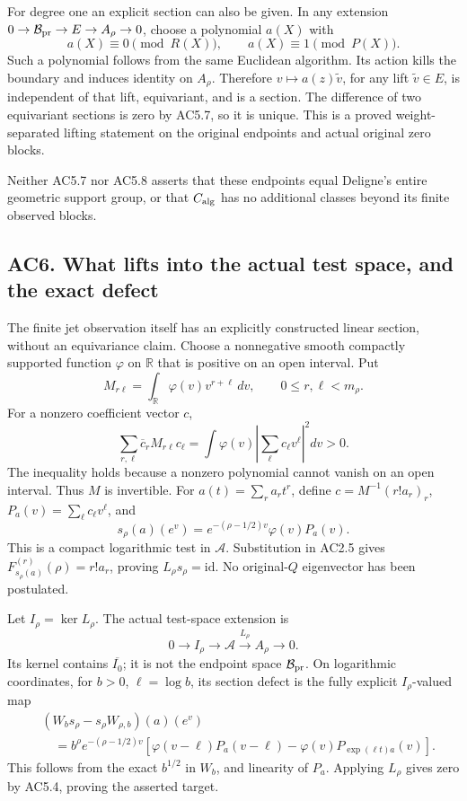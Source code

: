 For degree one an explicit section can also be given. In any extension
\(0\to\mathcal B_{\rm pr}\to E\to A_\rho\to0\), choose a polynomial
\(a(X)\) with \[
 a(X)\equiv0\pmod{R(X)},\qquad a(X)\equiv1\pmod{P(X)}.
\] Such a polynomial follows from the same Euclidean algorithm. Its
action kills the boundary and induces identity on \(A_\rho\). Therefore
\(v\mapsto a(z)\widetilde v\), for any lift \(\widetilde v\in E\), is
independent of that lift, equivariant, and is a section. The difference
of two equivariant sections is zero by AC5.7, so it is unique. This is a
proved weight-separated lifting statement on the original endpoints and
actual original zero blocks.

Neither AC5.7 nor AC5.8 asserts that these endpoints equal Deligne's
entire geometric support group, or that \(C_{\rm alg}\) has no
additional classes beyond its finite observed blocks.

\subsection{AC6. What lifts into the actual test space, and the exact
defect}\label{ac6.-what-lifts-into-the-actual-test-space-and-the-exact-defect}

The finite jet observation itself has an explicitly constructed linear
section, without an equivariance claim. Choose a nonnegative smooth
compactly supported function \(\varphi\) on \(\mathbb R\) that is
positive on an open interval. Put \[
 M_{r\ell}=\int_{\mathbb R}\varphi(v)v^{r+\ell}\,dv,
 \qquad 0\leq r,\ell<m_\rho.
\] For a nonzero coefficient vector \(c\), \[
 \sum_{r,\ell}\overline c_r M_{r\ell}c_\ell
 =\int\varphi(v)\left|\sum_\ell c_\ell v^\ell\right|^2dv>0.
\] The inequality holds because a nonzero polynomial cannot vanish on an
open interval. Thus \(M\) is invertible. For \(a(t)=\sum_ra_rt^r\),
define \(c=M^{-1}(r!a_r)_r\), \(P_a(v)=\sum_\ell c_\ell v^\ell\), and \[
 s_\rho(a)(e^v)=e^{-(\rho-1/2)v}\varphi(v)P_a(v).
\tag{AC6.1}
\] This is a compact logarithmic test in \(\mathcal A\). Substitution in
AC2.5 gives \(F_{s_\rho(a)}^{(r)}(\rho)=r!a_r\), proving
\(L_\rho s_\rho=\mathrm{id}\). No original-\(Q\) eigenvector has been
postulated.

Let \(I_\rho=\ker L_\rho\). The actual test-space extension is \[
 0\longrightarrow I_\rho\longrightarrow\mathcal A
 \xrightarrow{L_\rho}A_\rho\longrightarrow0.
\tag{AC6.2}
\] Its kernel contains \(\overline{I_0}\); it is not the endpoint space
\(\mathcal B_{\rm pr}\). On logarithmic coordinates, for \(b>0\),
\(\ell=\log b\), its section defect is the fully explicit
\(I_\rho\)-valued map \[
 \begin{aligned}
 &(W_b s_\rho-s_\rho W_{\rho,b})(a)(e^v)\\
 &\quad=b^\rho e^{-(\rho-1/2)v}
 \left[
 \varphi(v-\ell)P_a(v-\ell)
 -\varphi(v)P_{\exp(\ell t)a}(v)
 \right].
 \end{aligned}
\tag{AC6.3}
\] This follows from the exact \(b^{1/2}\) in \(W_b\), and linearity of
\(P_a\). Applying \(L_\rho\) gives zero by AC5.4, proving the asserted
target.

